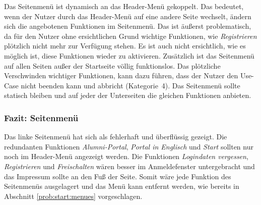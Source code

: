 {Das Seitenmenü ist dynamisch an das Header-Menü gekoppelt. Das bedeutet, wenn der Nutzer durch das Header-Menü auf eine andere Seite wechselt, ändern sich die angebotenen Funktionen im Seitenmenü. Das ist äußerst problematisch, da für den Nutzer ohne ersichtlichen Grund wichtige Funktionen, wie \emph{Registrieren} plötzlich nicht mehr zur Verfügung stehen. Es ist auch nicht ersichtlich, wie es möglich ist, diese Funktionen wieder zu aktivieren.
Zusätzlich ist das Seitenmenü auf allen Seiten außer der Startseite völlig funktionslos. 
}
{Das plötzliche Verschwinden wichtiger Funktionen, kann dazu führen, dass der Nutzer den Use-Case nicht beenden kann und abbricht (Kategorie~4).
}
{Das Seitenmenü sollte statisch bleiben und auf jeder der Unterseiten die gleichen Funktionen anbieten.
}\label{prob:start:seitenmenue}

\subsubsection*{Fazit: Seitenmenü}
Das linke Seitenmenü hat sich als fehlerhaft und überflüssig gezeigt. 
Die redundanten Funktionen \emph{Alumni-Portal}, \emph{Portal in Englisch} und \emph{Start} sollten nur noch im Header-Menü angezeigt werden. Die Funktionen \emph{Logindaten vergessen}, \emph{Registrieren} und \emph{Freischalten} wären besser im Anmeldefenster untergebracht und das Impressum sollte an den Fuß der Seite.
Somit wäre jede Funktion des Seitenmenüs ausgelagert und das Menü kann entfernt werden, wie bereits in Abschnitt \ref{prob:start:menues} vorgeschlagen.
